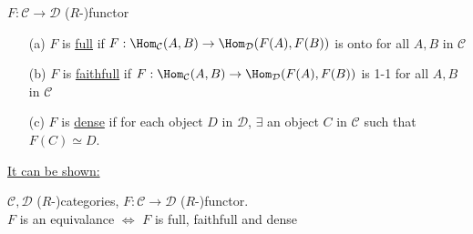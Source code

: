 \begin{defin}
$F: \mathcal{C} \to \mathcal{D}$ ($R$-)functor
\begin{enumerate}
\item[(a)] $F$ is \underline{full} if $F: \Hom_\mathcal{C}(A,B) \to \Hom_\mathcal{D}(F(A), F(B))$ is onto for all $A, B$ in $\mathcal{C}$
\item[(b)] $F$ is \underline{faithfull} if $F: \Hom_\mathcal{C}(A,B) \to \Hom_\mathcal{D}(F(A), F(B))$ is 1-1 for all $A, B$ in $\mathcal{C}$
\item[(c)] $F$ is \underline{dense} if for each object $D$ in $\mathcal{D}$, $\exists$ an object $C$ in $\mathcal{C}$ such that $F(C) \simeq D$.
\end{enumerate}
\end{defin}

\underline{It can be shown:}
\begin{prop}
$\mathcal{C}, \mathcal{D}$ ($R$-)categories, $F: \mathcal{C} \to \mathcal{D}$ ($R$-)functor.\\
$F$ is an equivalance $\iff$ $F$ is full, faithfull and dense
\end{prop}

